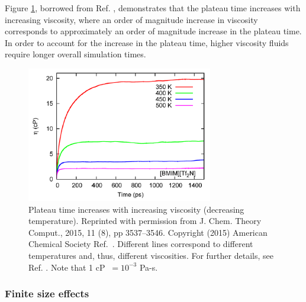\documentclass[9pt,bestpractices]{livecoms}
\begin{document}
Figure \ref{fig:ZhangFig10}, borrowed from Ref. \cite{Zhang2015}, demonstrates that the plateau time increases with increasing viscosity, where an order of magnitude increase in viscosity corresponds to approximately an order of magnitude increase in the plateau time. In order to account for the increase in the plateau time, higher viscosity fluids require longer overall simulation times.

\begin{figure}[htb!]
	\centering
	\includegraphics[width=3.2in]{ZhangFig10.png}
	\caption{Plateau time increases with increasing viscosity (decreasing temperature). Reprinted with permission from J. Chem. Theory Comput., 2015, 11 (8), pp 3537–3546. Copyright (2015) American Chemical Society Ref.\ \cite{Zhang2015}. Different lines correspond to different temperatures and, thus, different viscosities. For further details, see Ref. \cite{Zhang2015}. Note that 1 cP $\ = 10^{-3}$ Pa-s.}
	\label{fig:ZhangFig10}
\end{figure}



\subsubsection{Finite size effects} \label{sec:Viscosity:General: Finite size}

\end{document}
